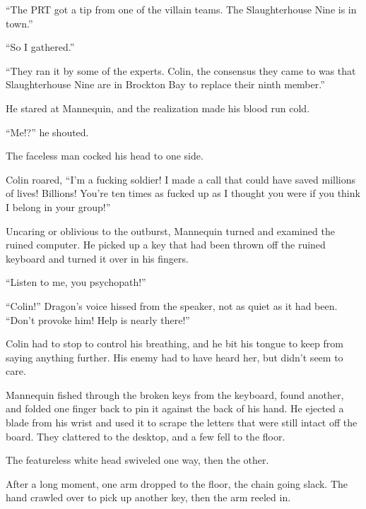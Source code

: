 ``The PRT got a tip from one of the villain teams.  The Slaughterhouse Nine is in town.''



``So I gathered.''



``They ran it by some of the experts.  Colin, the consensus they came to was that Slaughterhouse Nine are in Brockton Bay to replace their ninth member.''



He stared at Mannequin, and the realization made his blood run cold.



``Me!?'' he shouted.



The faceless man cocked his head to one side.



Colin roared, ``I'm a fucking soldier!  I made a call that could have saved millions of lives!  Billions!  You're ten times as fucked up as I thought you were if you think I belong in your group!''



Uncaring or oblivious to the outburst, Mannequin turned and examined the ruined computer.  He picked up a key that had been thrown off the ruined keyboard and turned it over in his fingers.



``Listen to me, you psychopath!''



``Colin!''  Dragon's voice hissed from the speaker, not as quiet as it had been.  ``Don't provoke him!  Help is nearly there!''



Colin had to stop to control his breathing, and he bit his tongue to keep from saying anything further.  His enemy had to have heard her, but didn't seem to care.



Mannequin fished through the broken keys from the keyboard, found another, and folded one finger back to pin it against the back of his hand.  He ejected a blade from his wrist and used it to scrape the letters that were still intact off the board.  They clattered to the desktop, and a few fell to the floor.



The featureless white head swiveled one way, then the other.



After a long moment, one arm dropped to the floor, the chain going slack.  The hand crawled over to pick up another key, then the arm reeled in.



